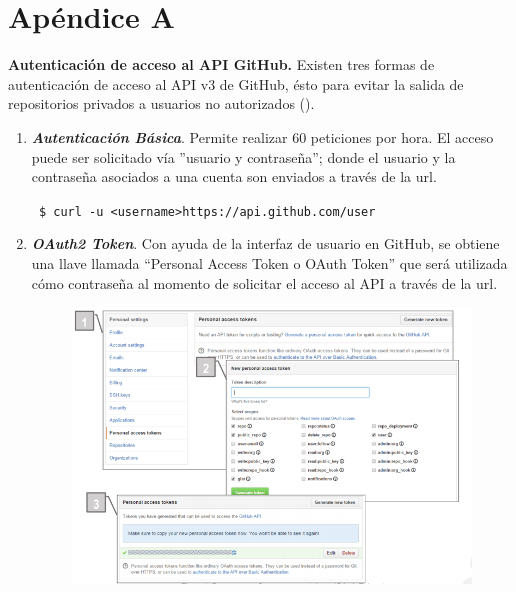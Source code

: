 %
%

\chapter{Apéndice A}
\label{app:app01}

\textbf{Autenticación de acceso al API GitHub.} Existen tres formas de autenticación de acceso al API v3 de GitHub, ésto para evitar la salida de repositorios privados a usuarios no autorizados (\citeyear{ratelimit_github}).

\begin{enumerate}[1.]
    \item \textbf{\textit{Autenticación Básica}}. Permite realizar 60 peticiones por hora. El acceso puede ser solicitado vía ''usuario y contraseña''; donde el usuario y la contraseña asociados a una cuenta son enviados a través de la url.
\begin{center}
\small \texttt{ \$ curl -u <username>\space https://api.github.com/user}
\end{center}		    
   
    \item  \textbf{\textit{OAuth2 Token}}. Con ayuda de la interfaz de usuario en GitHub, se obtiene una llave llamada “Personal Access Token o OAuth Token” que será utilizada cómo contraseña al momento de solicitar el acceso al API a través de la url. 
        \begin{figure}[H]
            \centering
            \includegraphics[height=0.4\textheight]{oauth_git}
            \label{fig:RHP02}
        \end{figure}
        

\end{enumerate}
